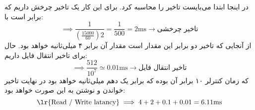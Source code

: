 در اینجا ابتدا می‌بایست تاخیر را محاسبه کرد. برای این کار یک تاخیر چرخش داریم که برابر است با:
\[
    \implies \frac{1}{(\frac{15000}{60})2} = \frac{1}{500} = 2 \text{ms} \longrightarrow \text{تاخیر چرخشی}
\]
از آنجایی که تاخیر
دو برابر این مقدار است مقدار آن برابر ۴ میلی‌‌ثانیه خواهد بود. حال برای تاخیر انتقال فایل داریم:
\[
    \implies \frac{512}{10^7} \simeq 0.01 \text{ms} \longrightarrow \text{تاخیر انتقال فایل}
\]
که زمان کنترلر ۱۰ برابر آن بوده که برابر یک دهم میلی‌ثانیه خواهد بود در نهایت تاخیر خواندن و نوشتن به این صورت خواهد بود:
\[
    \text{\lr{Read / Write latancy}} \implies 4 + 2 + 0.1 + 0.01 = 6.11 \text{ms}    
\]

